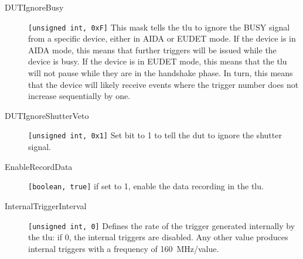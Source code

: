 \begin{description}
  \item[DUTIgnoreBusy] \verb|[unsigned int, 0xF]| This mask tells the \gls{tlu} to ignore the BUSY signal from a specific device, either in AIDA or EUDET mode. If the device is in AIDA mode, this means that further triggers will be issued while the device is busy. If the device is in EUDET mode, this means that the \gls{tlu} will not pause while they are in the handshake phase. In turn, this means that the device will likely receive events where the trigger number does not increase sequentially by one.
  \item[DUTIgnoreShutterVeto] \verb|[unsigned int, 0x1]| Set bit to 1 to tell the \gls{dut} to ignore the shutter signal.
  \item[EnableRecordData] \verb|[boolean, true]| if set to 1, enable the data recording in the \gls{tlu}.
  \item[InternalTriggerInterval] \verb|[unsigned int, 0]| Defines the rate of the trigger generated internally by the \gls{tlu}: if 0, the internal triggers are disabled. Any other value produces internal triggers with a frequency of 160~MHz/value.
\end{description} 